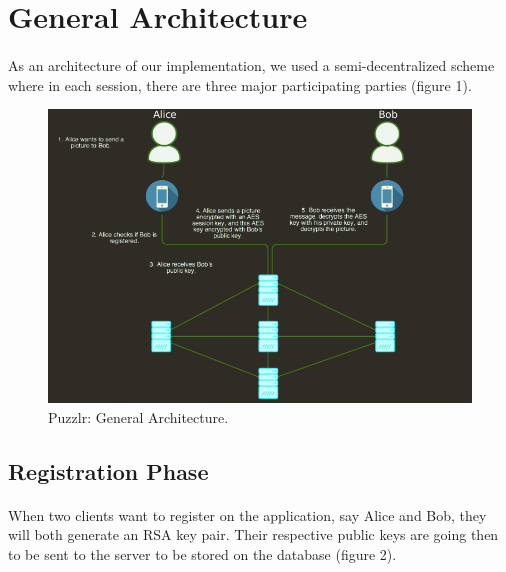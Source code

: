 \section{General Architecture}
    \paragraph{}
      As an architecture of our implementation, we used a semi-decentralized scheme where in each session, there are three major participating parties (figure 1).
 
      \begin{figure}[H]
      
	\centering
	\includegraphics[width=16cm]{images/architecture/architecture}
	\caption{Puzzlr: General Architecture.}
	\label{Figure 1}
      \end{figure}
      
      \subsection{Registration Phase}
      
	
	
	  
	\paragraph{}
	  When two clients want to register on the application, say Alice and Bob, they will both generate an RSA key pair. Their respective public keys are going then to be sent to the server to be stored on the database (figure 2).
	  

